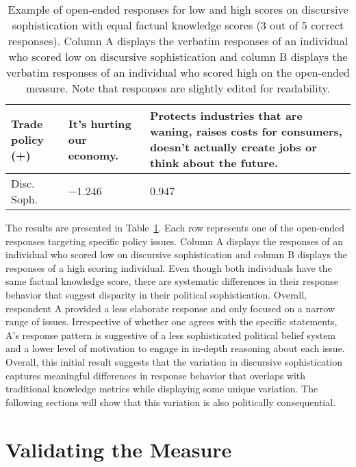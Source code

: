 \begin{table}[ht]
\begin{tabular}{l|p{5.0cm}|p{7.6cm}}
					\\\hdashline
Trade policy (+)	& It's hurting our economy.
					& Protects industries that are waning, raises costs for consumers, doesn't actually create jobs or think about the future.
					\\\midrule
Disc. Soph. 		& $-1.246$
					& $0.947$
					\\\bottomrule
\end{tabular}
\caption[Example of open-ended responses for low and high scores on discursive sophistication]{Example of open-ended responses for low and high scores on discursive sophistication with equal factual knowledge scores (3 out of 5 correct responses). Column A displays the verbatim responses of an individual who scored low on discursive sophistication and column B displays the verbatim responses of an individual who scored high on the open-ended measure. Note that responses are slightly edited for readability.}\label{tab:ex1}
\end{table}

The results are presented in Table~\ref{tab:ex1}. Each row represents one of the open-ended responses targeting specific policy issues. Column A displays the responses of an individual who scored low on discursive sophistication and column B displays the responses of a high scoring individual. Even though both individuals have the same factual knowledge score, there are systematic differences in their response behavior that suggest disparity in their political sophistication. Overall, respondent A provided a less elaborate response and only focused on a narrow range of issues. Irrespective of whether one agrees with the specific statements, A's response pattern is suggestive of a less sophisticated political belief system and a lower level of motivation to engage in in-depth reasoning about each issue. Overall, this initial result suggests that the variation in discursive sophistication captures meaningful differences in response behavior that overlaps with traditional knowledge metrics while displaying some unique variation. The following sections will show that this variation is also politically consequential.



\section*{Validating the Measure}

